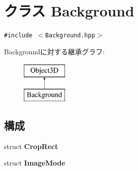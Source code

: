 \hypertarget{classm3g_1_1Background}{
\section{クラス Background}
\label{classm3g_1_1Background}
}
{\tt \#include $<$Background.hpp$>$}

Backgroundに対する継承グラフ:\begin{figure}[H]
\begin{center}
\leavevmode
\includegraphics[height=2cm]{classm3g_1_1Background}
\end{center}
\end{figure}
\subsection*{構成}
\begin{CompactItemize}
\item 
struct \textbf{CropRect}
\item 
struct \textbf{ImageMode}
\end{CompactItemize}
